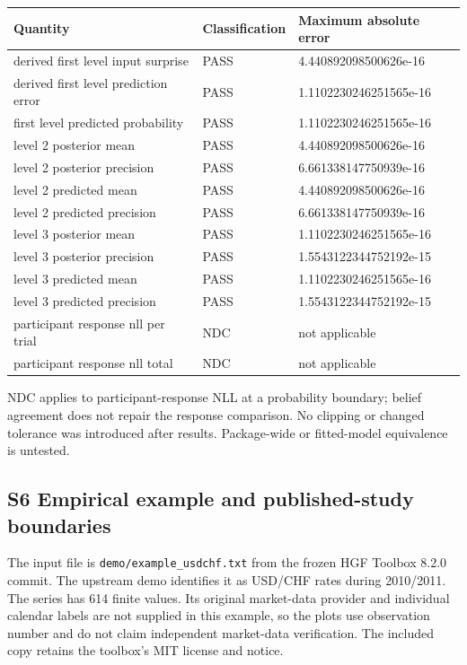 \documentclass[
  11pt,
]{article}
\newcounter{none} %
\begin{document}
{\def\LTcaptype{none} %
\begin{minipage}{\linewidth}
\begin{tabular}{@{}lll@{}}
\toprule\noalign{}
Quantity & Classification & Maximum absolute error \\
\midrule\noalign{}


derived first level input surprise & PASS & 4.440892098500626e-16 \\
derived first level prediction error & PASS & 1.1102230246251565e-16 \\
first level predicted probability & PASS & 1.1102230246251565e-16 \\
level 2 posterior mean & PASS & 4.440892098500626e-16 \\
level 2 posterior precision & PASS & 6.661338147750939e-16 \\
level 2 predicted mean & PASS & 4.440892098500626e-16 \\
level 2 predicted precision & PASS & 6.661338147750939e-16 \\
level 3 posterior mean & PASS & 1.1102230246251565e-16 \\
level 3 posterior precision & PASS & 1.5543122344752192e-15 \\
level 3 predicted mean & PASS & 1.1102230246251565e-16 \\
level 3 predicted precision & PASS & 1.5543122344752192e-15 \\
participant response nll per trial & NDC & not applicable \\
participant response nll total & NDC & not applicable \\
\bottomrule
\end{tabular}
\end{minipage}

}

NDC applies to participant-response NLL at a probability boundary;
belief agreement does not repair the response comparison. No clipping or
changed tolerance was introduced after results. Package-wide or
fitted-model equivalence is untested.

\subsection{S6 Empirical example and published-study
boundaries}\label{s6-empirical-example-and-published-study-boundaries}

The input file is \texttt{demo/example\_usdchf.txt} from the frozen HGF
Toolbox 8.2.0 commit. The upstream demo identifies it as USD/CHF rates
during 2010/2011. The series has 614 finite values. Its original
market-data provider and individual calendar labels are not supplied in
this example, so the plots use observation number and do not claim
independent market-data verification. The included copy retains the
toolbox's MIT license and notice.
\end{document}
